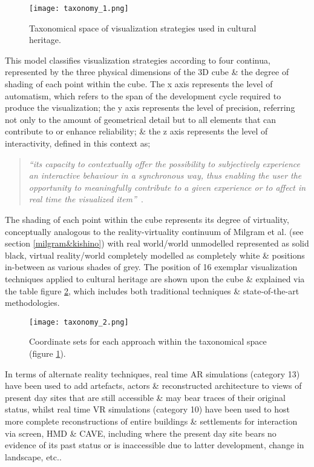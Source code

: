 \begin{figure}[h]
\centering
  \texttt{[image: taxonomy\_1.png]}
  \caption{Taxonomical space of visualization strategies used in cultural heritage.}
  \label{taxonomy_1.png}
\end{figure}

This model classifies visualization strategies according to four continua, represented by the three physical dimensions of the 3D cube \& the degree of shading of each point within the cube. The x axis represents the level of automatism, which refers to the span of the development cycle required to produce the visualization; the y axis represents the level of precision, referring not only to the amount of geometrical detail but to all elements that can contribute to or enhance reliability; \& the z axis represents the level of interactivity, defined in this context as;

\begin{quote}
	\textit{``its capacity to contextually offer the possibility to subjectively experience an interactive behaviour in a synchronous way, thus enabling the user the opportunity to meaningfully contribute to a given experience or to affect in real time the visualized  item''}~\cite{Foni2010}.
\end{quote}

The shading of each point within the cube represents its degree of virtuality, conceptually analogous to the reality-virtuality continuum of Milgram et al. (see section \ref{milgram&kishino}) with real world/world unmodelled represented as solid black, virtual reality/world completely modelled as completely white \& positions in-between as various shades of grey. The position of 16 exemplar visualization techniques applied to cultural heritage are shown upon the cube \& explained via the table figure \ref{taxonomy_2.png}, which includes both traditional techniques \& state-of-the-art methodologies.

\begin{figure}[h]
\centering
  \texttt{[image: taxonomy\_2.png]}
  \caption{Coordinate sets for each approach within the taxonomical space (figure \ref{taxonomy_1.png}).}
  \label{taxonomy_2.png}
\end{figure}


In terms of alternate reality techniques, real time AR simulations (category 13) have been used to add artefacts, actors \& reconstructed architecture to views of present day sites that are still accessible \& may bear traces of their original status, whilst real time VR simulations (category 10) have been used to host more complete reconstructions of entire buildings \& settlements for interaction via screen, HMD \& CAVE, including where the present day site bears no evidence of its past status or is inaccessible due to latter development, change in landscape, etc..


